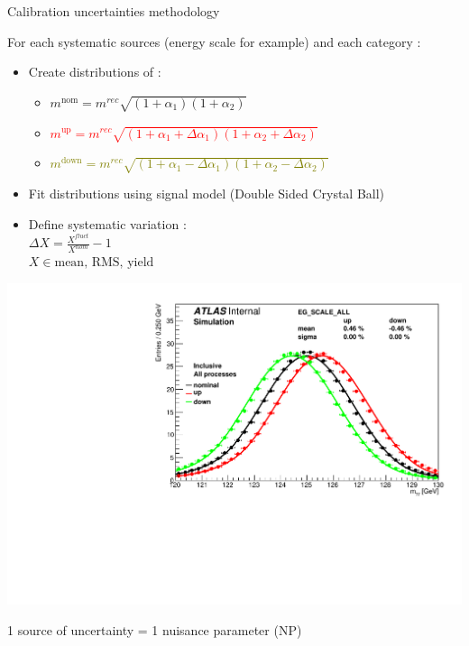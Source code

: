 \begin{frame}{Calibration uncertainties methodology}

      For each systematic sources (energy scale for example) and each category : 
      \begin{itemize}
      \item Create distributions of :
        \begin{itemize}
        \item $m^\text{nom} = m^{rec}\sqrt{(1+\alpha_1)(1+\alpha_2)}$
        \item \textcolor{red}{$m^\text{up} = m^{rec}\sqrt{(1+\alpha_1 + \Delta\alpha_1)(1+\alpha_2+\Delta\alpha_2)}$}
        \item \textcolor{olive}{$m^\text{down} = m^{rec}\sqrt{(1+\alpha_1 - \Delta\alpha_1)(1+\alpha_2-\Delta\alpha_2)} $}
        \end{itemize}

      \end{itemize}

  \begin{minipage}{0.49\linewidth}
    \begin{itemize}
            \item Fit distributions using signal model (Double Sided Crystal Ball)
    \item Define systematic variation : \\$\Delta X = \frac{X^{fluct}}{X^{nom}}-1$ \\ $X\in {\text{mean, RMS, yield}}$
    \end{itemize}
    \end{minipage}
    \hfill
    \begin{minipage}{0.49\linewidth}
      \includegraphics[width=\linewidth]{Figures/h013_EG_SCALE_ALL_0.pdf}
    \end{minipage}
    \vfill
      1 source of uncertainty = 1 nuisance parameter (NP)
\end{frame}

